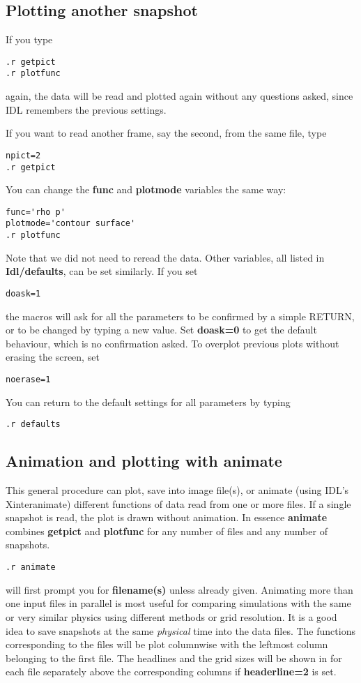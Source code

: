 \subsection{Plotting another snapshot \label{s-plot-another}}

   If you type
\begin{verbatim}
.r getpict
.r plotfunc
\end{verbatim}
   again, the data will be read and plotted again without any questions asked,
   since IDL remembers the previous settings. 

   If you want to read another frame, say the second, from the same file, type
\begin{verbatim}
npict=2
.r getpict
\end{verbatim}
   You can change the {\bf func} and {\bf plotmode} variables the same way:
\begin{verbatim}
func='rho p'
plotmode='contour surface'
.r plotfunc
\end{verbatim}
   Note that we did not need to reread the data.
   Other variables, all listed in {\bf Idl/defaults}, can be set similarly.
   If you set
\begin{verbatim}
doask=1
\end{verbatim}
   the macros will ask for all the parameters to be confirmed by a simple
   RETURN, or to be changed by typing a new value. Set {\bf doask=0} to
   get the default behaviour, which is no confirmation asked.
   To overplot previous plots without erasing the screen, set
\begin{verbatim}
noerase=1
\end{verbatim}
   You can return to the default settings for all parameters by typing
\begin{verbatim}
.r defaults
\end{verbatim}

\subsection{Animation and plotting with animate \label{s-animate}}

   This general procedure can plot, save into image file(s), or animate 
   (using IDL's Xinteranimate) different functions of data 
   read from one or more files. If a single snapshot is read, the
   plot is drawn without animation. In essence {\bf animate} combines
   {\bf getpict} and {\bf plotfunc} for any number of files and any number 
   of snapshots.
\begin{verbatim}
.r animate
\end{verbatim}
   will first prompt you for {\bf filename(s)} unless already given. 
   Animating more than one input files in parallel is
   most useful for comparing simulations with the same or very similar physics
   using different methods or grid resolution. It is a good idea to save 
   snapshots at the same {\it physical} time into the data files.
   The functions corresponding to the files will be plot columnwise
   with the leftmost column belonging to the first file.
   The headlines and the grid sizes will be shown in 
   for each file separately above the corresponding columns
   if {\bf headerline=2} is set.

